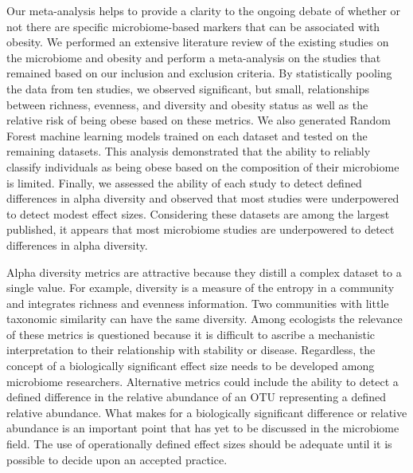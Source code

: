 \documentclass[12pt,]{article}
\begin{document}
Our meta-analysis helps to provide a clarity to the ongoing debate of
whether or not there are specific microbiome-based markers that can be
associated with obesity. We performed an extensive literature review of
the existing studies on the microbiome and obesity and perform a
meta-analysis on the studies that remained based on our inclusion and
exclusion criteria. By statistically pooling the data from ten studies,
we observed significant, but small, relationships between richness,
evenness, and diversity and obesity status as well as the relative risk
of being obese based on these metrics. We also generated Random Forest
machine learning models trained on each dataset and tested on the
remaining datasets. This analysis demonstrated that the ability to
reliably classify individuals as being obese based on the composition of
their microbiome is limited. Finally, we assessed the ability of each
study to detect defined differences in alpha diversity and observed that
most studies were underpowered to detect modest effect sizes.
Considering these datasets are among the largest published, it appears
that most microbiome studies are underpowered to detect differences in
alpha diversity.

Alpha diversity metrics are attractive because they distill a complex
dataset to a single value. For example, diversity is a measure of the
entropy in a community and integrates richness and evenness information.
Two communities with little taxonomic similarity can have the same
diversity. Among ecologists the relevance of these metrics is questioned
because it is difficult to ascribe a mechanistic interpretation to their
relationship with stability or disease. Regardless, the concept of a
biologically significant effect size needs to be developed among
microbiome researchers. Alternative metrics could include the ability to
detect a defined difference in the relative abundance of an OTU
representing a defined relative abundance. What makes for a biologically
significant difference or relative abundance is an important point that
has yet to be discussed in the microbiome field. The use of
operationally defined effect sizes should be adequate until it is
possible to decide upon an accepted practice.
\end{document}

